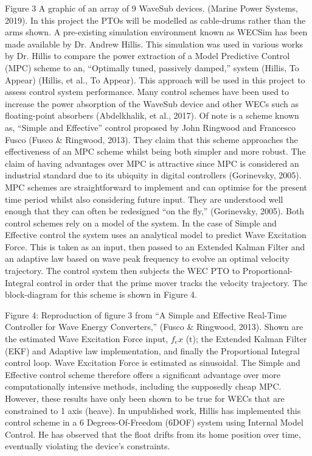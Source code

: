 \documentclass{report}
\begin{document}
Figure 3 A graphic of an array of 9 WaveSub devices. (Marine Power Systems, 2019). In this project the PTOs will be modelled as cable-drums rather than the arms shown. A pre-existing simulation environment known as WECSim has been made available by Dr. Andrew Hillis. This simulation was used in various works by Dr. Hillis to compare the power extraction of a Model Predictive Control (MPC) scheme to an, ``Optimally tuned, passively damped,'' system (Hillis, To Appear) (Hillis, et al., To Appear). This approach will be used in this project to assess control system performance. Many control schemes have been used to increase the power absorption of the WaveSub device and other WECs such as floating-point absorbers (Abdelkhalik, et al., 2017). Of note is a scheme known as, ``Simple and Effective'' control proposed by John Ringwood and Francesco Fusco (Fusco \& Ringwood, 2013). They claim that this scheme approaches the effectiveness of an MPC scheme whilst being both simpler and more robust. The claim of having advantages over MPC is attractive since MPC is considered an industrial standard due to its ubiquity in digital controllers (Gorinevsky, 2005). MPC schemes are straightforward to implement and can optimise for the present time period whilst also considering future input. They are understood well enough that they can often be redesigned ``on the fly,'' (Gorinevsky, 2005). Both control schemes rely on a model of the system. In the case of Simple and Effective control the system uses an analytical model to predict Wave Excitation Force. This is taken as an input, then passed to an Extended Kalman Filter and an adaptive law based on wave peak frequency to evolve an optimal velocity trajectory. The control system then subjects the WEC PTO to Proportional-Integral control in order that the prime mover tracks the velocity trajectory. The block-diagram for this scheme is shown in Figure 4. 

Figure 4: Reproduction of figure 3 from ``A Simple and Effective Real-Time Controller for Wave Energy Converters,'' (Fusco \& Ringwood, 2013). Shown are the estimated Wave Excitation Force input, $f_ex$ (t); the Extended Kalman Filter (EKF) and Adaptive law implementation, and finally the Proportional Integral control loop. Wave Excitation Force is estimated as sinusoidal. The Simple and Effective control scheme therefore offers a significant advantage over more computationally intensive methods, including the supposedly cheap MPC. However, these results have only been shown to be true for WECs that are constrained to 1 axis (heave). In unpublished work, Hillis has implemented this control scheme in a 6 Degrees-Of-Freedom (6DOF) system using Internal Model Control. He has observed that the float drifts from its home position over time, eventually violating the device’s constraints. 
\end{document}
